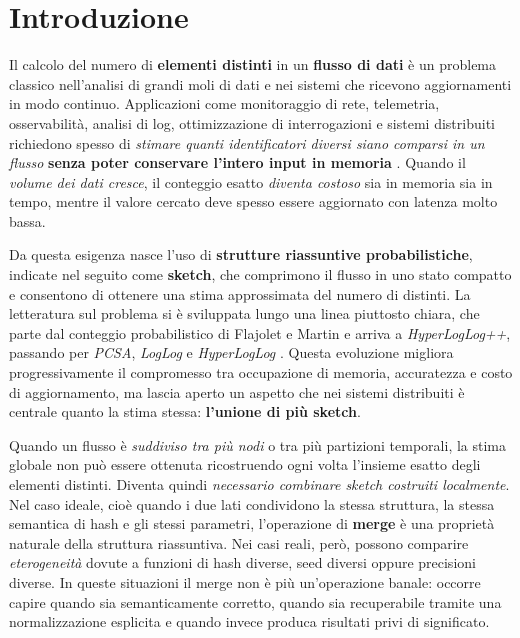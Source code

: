 
\chapter{Introduzione}
\label{chp:introduzione}

Il calcolo del numero di \textbf{elementi distinti} in un \textbf{flusso di dati} è un problema classico nell'analisi di
grandi moli di dati e nei sistemi che ricevono aggiornamenti in modo continuo.
Applicazioni come monitoraggio di rete, telemetria, osservabilità, analisi di
log, ottimizzazione di interrogazioni e sistemi distribuiti richiedono spesso
di \textit{stimare quanti identificatori diversi siano comparsi in un flusso} \textbf{senza
poter conservare l'intero input in memoria}
\cite{Leskovec_Rajaraman_Ullman_2014,Muthukrishnan_2005,Cormode_2017}. Quando
il \textit{volume dei dati cresce}, il conteggio esatto \textit{diventa costoso} sia in memoria
sia in tempo, mentre il valore cercato deve spesso essere aggiornato con
latenza molto bassa.

Da questa esigenza nasce l'uso di \textbf{strutture riassuntive probabilistiche},
indicate nel seguito come \textbf{sketch}, che comprimono il flusso in uno stato
compatto e consentono di ottenere una stima approssimata del numero di
distinti. La letteratura sul problema si è sviluppata lungo una linea piuttosto
chiara, che parte dal conteggio probabilistico di Flajolet e Martin e arriva a
\textit{HyperLogLog++}, passando per \textit{PCSA}, \textit{LogLog} e \textit{HyperLogLog}
\cite{Flajolet_Martin_1985,Durand_Flajolet_2003,Flajolet_Fusy_Gandouet_Meunier_2007,Heule_Nunkesser_Hall_2013}.
Questa evoluzione migliora progressivamente il compromesso tra occupazione di
memoria, accuratezza e costo di aggiornamento, ma lascia aperto un aspetto che
nei sistemi distribuiti è centrale quanto la stima stessa: \textbf{l'unione di pi\`u sketch}.

Quando un flusso è \textit{suddiviso tra più nodi} o tra più partizioni temporali, la
stima globale non può essere ottenuta ricostruendo ogni volta l'insieme esatto
degli elementi distinti. Diventa quindi \textit{necessario combinare sketch costruiti localmente}.
Nel caso ideale, cioè quando i due lati condividono la stessa struttura, la
stessa semantica di hash e gli stessi parametri, l'operazione di \textbf{merge} è una proprietà
naturale della struttura riassuntiva. Nei casi reali, però, possono comparire
\textit{eterogeneità} dovute a funzioni di hash diverse, seed diversi oppure precisioni
diverse. In queste situazioni il merge non è più un'operazione banale: occorre
capire quando sia semanticamente corretto, quando sia recuperabile tramite una
normalizzazione esplicita e quando invece produca risultati privi di significato.

